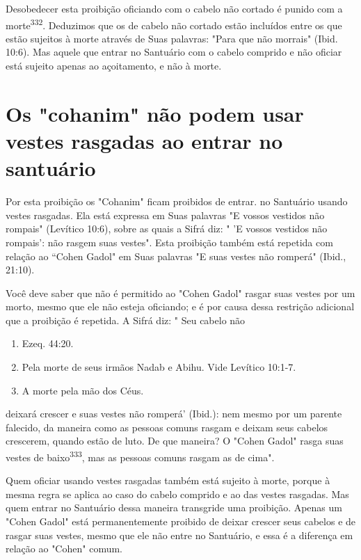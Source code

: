 \begin{itemize}
\begin{enumrate}
\begin{itemize}
\begin{itemize}
\begin{itemize}
Desobedecer esta proibição oficiando com o cabelo não cortado é punido
com a morte\textsuperscript{332}. Deduzimos que os de cabelo não cortado
estão incluí­dos entre os que estão sujeitos à morte através de Suas
palavras: "Para que não morrais" (Ibid. 10:6). Mas aquele que entrar no
Santuário com o cabelo com­prido e não oficiar está sujeito apenas ao
açoitamento, e não à morte.

\section{Os "cohanim" não podem usar vestes rasgadas ao entrar no santuário}

Por esta proibição os "Cohanim" ficam proibidos de entrar. no San­tuário
usando vestes rasgadas. Ela está expressa em Suas palavras "E vossos
ves­tidos não rompais" (Levítico 10:6), sobre as quais a Sifrá diz: " 'E
vossos vesti­dos não rompais': não rasgem suas vestes". Esta proibição
também está repeti­da com relação ao ``Cohen Gadol" em Suas palavras "E
suas vestes não rompe­rá" (Ibid., 21:10).

Você deve saber que não é permitido ao "Cohen Gadol" rasgar suas vestes
por um morto, mesmo que ele não esteja oficiando; e é por causa dessa
restrição adicional que a proibição é repetida. A Sifrá diz: " Seu
cabelo não


\begin{enumerate}
\def\labelenumi{\arabic{enumi}.}
\setcounter{enumi}{329}
\item
 
 Ezeq. 44:20.
 
\item
 
 Pela morte de seus irmãos Nadab e Abihu. Vide Levítico 10:1-7.
 
\item
 
 A morte pela mão dos Céus.
 
\end{enumerate}



deixará crescer e suas vestes não romperá' (Ibid.): nem mesmo por um
parente falecido, da maneira como as pessoas comuns rasgam e deixam seus
cabelos crescerem, quando estão de luto. De que maneira? O "Cohen Gadol"
rasga suas vestes de baixo\textsuperscript{333}, mas as pessoas comuns
rasgam as de cima".

Quem oficiar usando vestes rasgadas também está sujeito à morte, porque
à mesma regra se aplica ao caso do cabelo comprido e ao das vestes
rasgadas. Mas quem entrar no Santuário dessa maneira transgride uma
proibi­ção. Apenas um "Cohen Gadol" está permanentemente proibido de
deixar cres­cer seus cabelos e de rasgar suas vestes, mesmo que ele não
entre no Santuário, e essa é a diferença em relação ao "Cohen" comum.


\end{itemize}
\end{itemize}
\end{itemize}
\end{enumrate}
\end{itemize}
